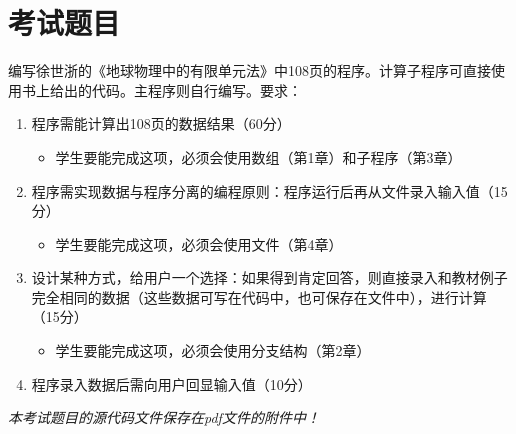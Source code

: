 \documentclass[hyperref,UTF-8]{ctexart}
\begin{document}
\section{考试题目}
编写徐世浙的《地球物理中的有限单元法》中108页的程序。计算子程序可直接使用书上给出的代码。主程序则自行编写。要求：
\begin{enumerate}
\item 程序需能计算出108页的数据结果（60分）
\begin{itemize}
\item 学生要能完成这项，必须会使用数组（第1章）和子程序（第3章）
\end{itemize}
\item 程序需实现数据与程序分离的编程原则：程序运行后再从文件录入输入值（15分）
\begin{itemize}
\item 学生要能完成这项，必须会使用文件（第4章）
\end{itemize}
\item 设计某种方式，给用户一个选择：如果得到肯定回答，则直接录入和教材例子完全相同的数据（这些数据可写在代码中，也可保存在文件中），进行计算（15分）
\begin{itemize}
\item 学生要能完成这项，必须会使用分支结构（第2章）
\end{itemize}
\item 程序录入数据后需向用户回显输入值（10分）
\end{enumerate}

\emph{本考试题目的源代码文件保存在pdf文件的附件中！}
\end{document}
